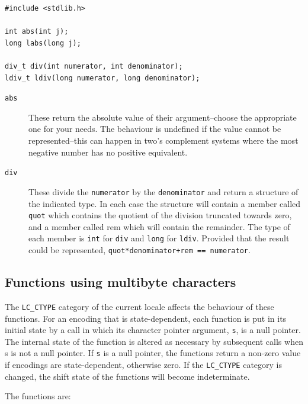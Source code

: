    \begin{Verbatim}
#include <stdlib.h>

int abs(int j);
long labs(long j);

div_t div(int numerator, int denominator);
ldiv_t ldiv(long numerator, long denominator);
\end{Verbatim}

   \begin{description}
    \item[\texttt{abs}] These return the  absolute  value  of  their  argument--choose the
     appropriate one for your needs.  The behaviour is undefined if the value
     cannot be  represented--this can  happen  in  two's  complement
     systems where the most negative number has no positive equivalent.

    \item[\texttt{div}] These divide the \texttt{numerator} by the \texttt{denominator}
     and  return a  structure  of  the  indicated  type.  In each case the
     structure  will  contain  a  member  called \texttt{quot}   which
     contains  the  quotient of the division truncated towards zero, and
     a member called  rem  which  will  contain  the remainder.   The  type  of
     each member is \texttt{int} for \texttt{div} and \texttt{long}
     for  \texttt{ldiv}.   Provided  that  the  result  could  be
     represented, \texttt{quot*denominator+rem == numerator}.
   \end{description}

  

  \subsection{Functions using multibyte characters}
   

   The \texttt{LC\_CTYPE} category of the current locale affects the
    behaviour of these functions. For an encoding that is state-dependent, each
    function is put in its initial state by a call in which its character
    pointer argument, \texttt{s}, is a null pointer. The internal state of
    the function is altered as necessary by subsequent calls when s is not
    a null pointer.  If \texttt{s} is a null pointer, the functions return
    a non-zero value if encodings are state-dependent, otherwise zero. If the
    \texttt{LC\_CTYPE} category is changed, the shift state of the functions
    will become indeterminate.


   The functions are:


